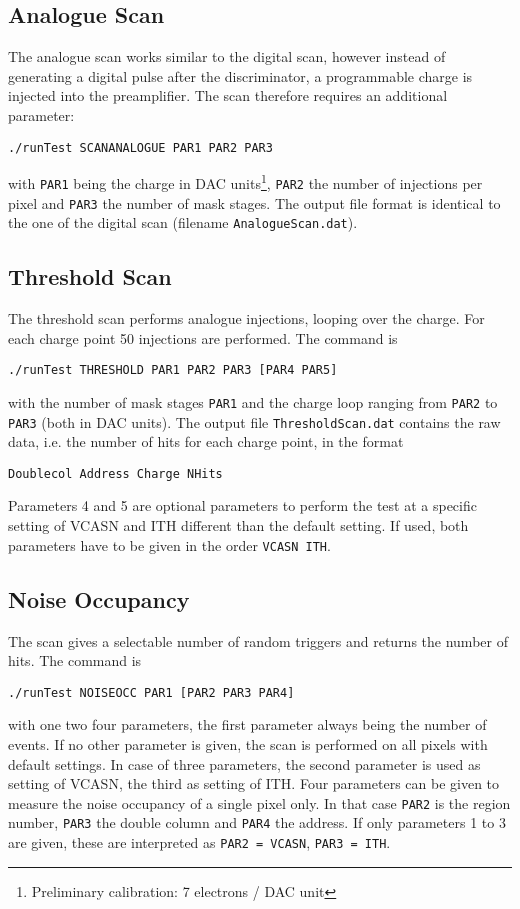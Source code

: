 \documentclass{article}
\begin{document}
\subsection{Analogue Scan}
The analogue scan works similar to the digital scan, however instead
of generating a digital pulse after the discriminator, a programmable charge is
injected into the preamplifier. The scan therefore requires an
additional parameter:
\begin{verbatim}
./runTest SCANANALOGUE PAR1 PAR2 PAR3
\end{verbatim}
with \texttt{PAR1} being the charge in DAC units\footnote{Preliminary
  calibration: 7 electrons / DAC unit}, \texttt{PAR2} the number of
injections per pixel and \texttt{PAR3} the number of mask stages. The
output file format is identical to the one of the digital scan
(filename \texttt{AnalogueScan.dat}).

\subsection{Threshold Scan}
The threshold scan performs analogue injections, looping over the
charge. For each charge point 50 injections are performed. The command
is 
\begin{verbatim}
./runTest THRESHOLD PAR1 PAR2 PAR3 [PAR4 PAR5]
\end{verbatim}
with the number of mask stages \texttt{PAR1} and the charge loop
ranging from \texttt{PAR2} to \texttt{PAR3} (both in DAC units). The
output file \texttt{ThresholdScan.dat} contains the raw data, i.e. the
number of hits for each charge point, in the format
\begin{verbatim}
Doublecol Address Charge NHits
\end{verbatim}

Parameters 4 and 5 are optional parameters to perform the test at a
specific setting of VCASN and ITH different than the default
setting. If used, both parameters have to be given in the order
\texttt{VCASN ITH}.

\subsection{Noise Occupancy}
The scan gives a selectable number of random triggers and returns the
number of hits. The command is 
\begin{verbatim}
./runTest NOISEOCC PAR1 [PAR2 PAR3 PAR4]
\end{verbatim}
with one two four parameters, the first parameter always being the
number of events. If no other parameter is given, the scan is
performed on all pixels with default settings. In case of three
parameters, the second parameter is used as setting of VCASN, the
third as setting of ITH. Four parameters can be given to measure the
noise occupancy of a single pixel only. In that case \texttt{PAR2} is
the region number, \texttt{PAR3} the double column and \texttt{PAR4}
the address. If only parameters 1 to 3 are given, these are
interpreted as \texttt{PAR2 = VCASN}, \texttt{PAR3 = ITH}.
\end{document}
